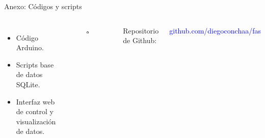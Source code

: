 \begin{frame}{Anexo: Códigos y scripts}
\begin{columns}
        \centering
        \begin{itemize}
            \item Código Arduino.
            \item Scripts base de datos SQLite.
            \item Interfaz web de control y visualización de datos.
        \end{itemize}
        \centering
\begin{figure}[ht!]
    \includegraphics[width=0.4\textwidth]{dump/25231.png}
    \end{figure}
    
    Repositorio de Github:
    
    \textcolor{blue}{github.com/diegoconchaa/fas}
    \end{columns}
\end{frame}
